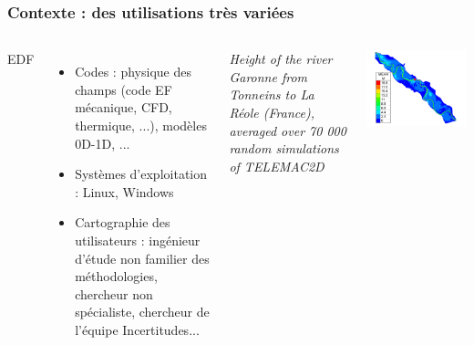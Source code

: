 \documentclass{beamer}
\begin{document}
\begin{frame}[containsverbatim]
\frametitle{Contexte : des utilisations très variées}

  \begin{columns}
EDF
\begin{itemize}
\item Codes : physique des champs (code EF mécanique, CFD, thermique, ...), modèles 0D-1D, ...
\item Systèmes d'exploitation : Linux, Windows
\item Cartographie des utilisateurs : ingénieur d'étude non familier des méthodologies, chercheur non spécialiste, chercheur de l'équipe Incertitudes... 
\end{itemize}

\emph{Height of the river Garonne from Tonneins to La Réole (France), averaged over
70 000 random simulations of TELEMAC2D}
\begin{center}
\includegraphics[width=\textwidth]{figures/Garonne-Height-Mean}
\end{center}

  \end{columns}

\end{frame}

\end{document}
